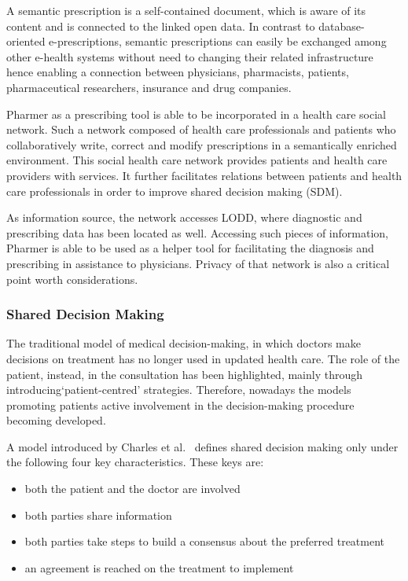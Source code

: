 \documentclass[journal]{IEEEtran}
\begin{document}
A semantic prescription is a self-contained document, which is aware of its content and is connected to the linked open data.
In contrast to database-oriented e-prescriptions, semantic prescriptions can easily be exchanged among other e-health systems without need to changing their related infrastructure hence enabling a connection between physicians, pharmacists, patients, pharmaceutical researchers, insurance and drug companies.

Pharmer as a prescribing tool is able to be incorporated in a health care social network.
Such a network composed of health care professionals and patients who collaboratively write, correct and modify prescriptions in a semantically enriched environment.
This social health care network provides patients and health care providers with services.
It further facilitates relations between patients and health care professionals in order to improve shared decision making (SDM).

As information source, the network accesses LODD, where diagnostic and prescribing data has been located as well.
Accessing such pieces of information, Pharmer is able to be used as a helper tool for facilitating the diagnosis and prescribing in assistance to physicians.
Privacy of that network is also a critical point worth considerations.\\

\subsubsection{Shared Decision Making}
\label{subsec: SDM}
 The traditional model of medical decision-making, in which doctors make decisions on treatment has no longer used in updated health care.
 The role of the patient, instead, in the consultation has been highlighted, mainly through introducing‘patient-centred’ strategies.
 Therefore, nowadays the models promoting patients active involvement in the decision-making procedure becoming developed.

 A model introduced by Charles et al.~\cite{Charles1997} defines shared decision making only under the following four key characteristics.
 These keys are:
 \begin{itemize}
   \item both the patient and the doctor are involved
   \item both parties share information
   \item both parties take steps to build a consensus about the preferred treatment
   \item an agreement is reached on the treatment to implement
 \end{itemize}
\end{document}
